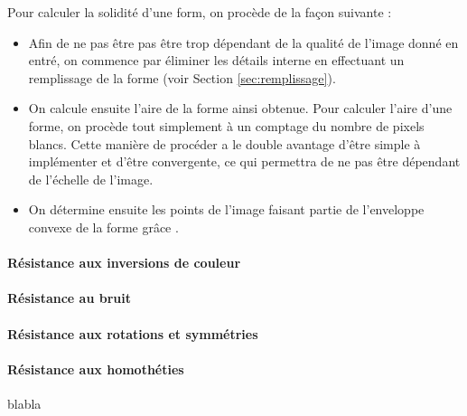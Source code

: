 \documentclass{article}
\theoremstyle{definition}
\begin{document}
	  Pour calculer la solidité d'une form, on procède de la façon suivante :
	  \begin{itemize}
	   \item Afin de ne pas être pas être trop dépendant de la qualité de l'image donné en entré, on commence par éliminer les détails interne en effectuant un remplissage de la forme (voir Section \ref{sec:remplissage}).
	   \item On calcule ensuite l'aire de la forme ainsi obtenue. Pour calculer l'aire d'une forme, on procède tout simplement à un comptage du nombre de pixels blancs. Cette manière de procéder a le double avantage d'être simple à implémenter et d'être convergente, ce qui permettra de ne pas être dépendant de l'échelle de l'image.
	   \item On détermine ensuite les points de l'image faisant partie de l'enveloppe convexe de la forme grâce .
	  \end{itemize}
  
	
	\paragraph{Résistance aux inversions de couleur}
	
	\paragraph{Résistance au bruit}
	


	
	\paragraph{Résistance aux rotations et symmétries}
      
	\paragraph{Résistance aux homothéties} blabla \\
	
\end{document}
